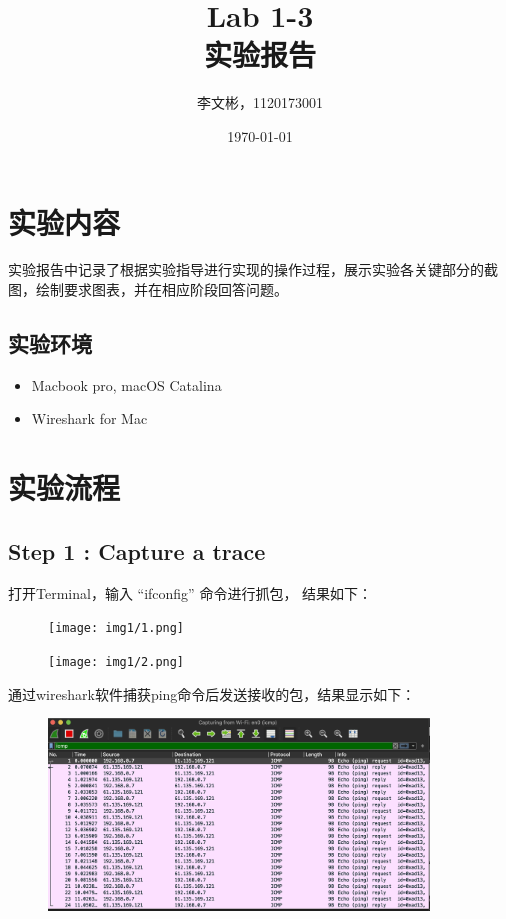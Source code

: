 \documentclass{article}
\title{Lab 1-3 \\实验报告}
\author{李文彬，1120173001}
\date{\today}
\begin{document}
	\maketitle
	\section{实验内容}
实验报告中记录了根据实验指导进行实现的操作过程，展示实验各关键部分的截图，绘制要求图表，并在相应阶段回答问题。
\subsection{实验环境}
\begin{itemize}
\item[]Macbook pro, macOS Catalina
\item[]Wireshark for Mac
\end{itemize}


\section{实验流程}
\subsection{Step 1 : Capture a trace}
打开Terminal，输入 “ifconfig” 命令进行抓包，
结果如下：
\begin{figure}[H]
        \centering
        \texttt{[image: img1/1.png]}
        \caption{}
        \label{fig.1}
    \end{figure}
  
   \begin{figure}[H]
        \centering
        \texttt{[image: img1/2.png]}
        \caption{}
        \label{fig.1}
    \end{figure}
%
%
%
%
%
%
%
    
   
    通过wireshark软件捕获ping命令后发送接收的包，结果显示如下：
    \begin{figure}[H]
        \centering
        \includegraphics[width=0.9\textwidth]{img/exp1.png}
        \caption{}
        \label{fig.2}
    \end{figure}
  
\end{document}
